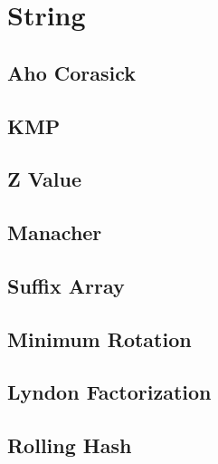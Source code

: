 \documentclass[a4paper,10pt,twocolumn,oneside,x11names]{article}
\begin{document}
\section{String}

\subsection{Aho Corasick}


\subsection{KMP}


\subsection{Z Value}


\subsection{Manacher}


\subsection{Suffix Array}


%

\subsection{Minimum Rotation}


\subsection{Lyndon Factorization}


\subsection{Rolling Hash}

\end{document}
